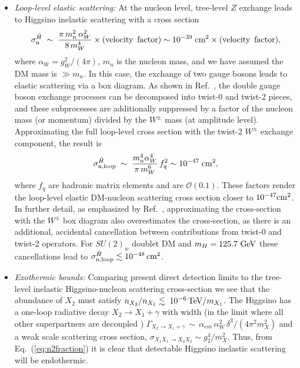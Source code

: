 \documentclass[11pt]{article}
\begin{document}
\begin{itemize}
\item {\it Loop-level elastic scattering:} At the nucleon level, tree-level $Z$ exchange leads to Higgsino inelastic scattering with a cross section
\begin{align}
\sigma_{\rm n}^{\tilde{H}} \; \sim \; \frac{\pi\, m_n^2\, \alpha^2_W}{8\, m^4_W}\times (\text{velocity\, factor}) \sim 10^{-39}\; \text{cm}^2 \times (\text{velocity\, factor}), 
\end{align}
where $\alpha_W = g^2_W/(4\pi)$, $m_n$ is the nucleon mass, and we have assumed the DM mass is $\gg m_n$. In this case, the exchange of two gauge bosons leads to elastic scattering via a box diagram. As shown in Ref.~\cite{Hisano:2010fy, Hisano:2011cs,Hill:2013hoa,Hill:2014yka}, the double gauge boson exchange processes can be decomposed into twist-0 and twist-2 pieces, and these subprocesses are additionally suppressed by a factor of the nucleon mass (or momentum) divided by the $W^{\pm}$ mass (at amplitude level). Approximating the full loop-level cross section with the twist-2 $W^{\pm}$ exchange component, the result is
 \begin{equation}
 \sigma_{\rm n, loop}^{\tilde{H}}\; \sim \; \frac{m_n^4 \alpha^4_W}{\pi\, m^6_W}\, f_q^2 \sim 10^{-47} \; {\rm cm}^2,
 \end{equation}
where $f_q$ are hadronic matrix elements and are $\mathcal{O}(0.1)$. These factors render the loop-level elastic DM-nucleon scattering cross section closer to $10^{-47} {\rm cm}^2$. In further detail, as emphasized by Ref.~\cite{Hisano:2010fy, Hisano:2011cs,Hill:2013hoa,Hill:2014yka}, approximating the cross-section with the $W^{\pm}$ box diagram also overestimates the cross-section, as there is an additional, accidental cancellation between contributions from twist-0 and twist-2 operators. For $SU(2)_w$ doublet DM and $m_H = 125.7~{\rm GeV}$ these cancellations lead to $ \sigma_{\rm n, loop}^{\tilde{H}} \lesssim 10^{-48}\, \text{cm}^2$. 

\item {\it Exothermic bounds:} Comparing present direct detection limits to the tree-level inelastic Higgsino-nucleon scattering cross-section we see that the abundance of $X_2$ must satisfy
$n_{X_2}/n_{X_1}  \lesssim \; 10^{-6} \,{\rm TeV}/m_{X_1}$.  The Higgsino has a one-loop radiative decay $X_2 \rightarrow X_1 + \gamma$ with width (in the limit where all other superpartners are decoupled \cite{Haber:1988px})
$\Gamma_{X_2 \rightarrow X_1+\gamma}\, \sim\, \alpha_{em}\, \alpha^2_W\, \delta^3/(4\pi^2 m^2_X)$ and a weak scale scattering cross section,
$\sigma_{X_1X_1\rightarrow X_2X_2} \sim g_2^4/m_X^2$.
Thus, from Eq.~(\ref{eq:n2fraction}) it is clear that detectable Higgsino inelastic scattering will be endothermic.  
\end{itemize}
\end{document}
